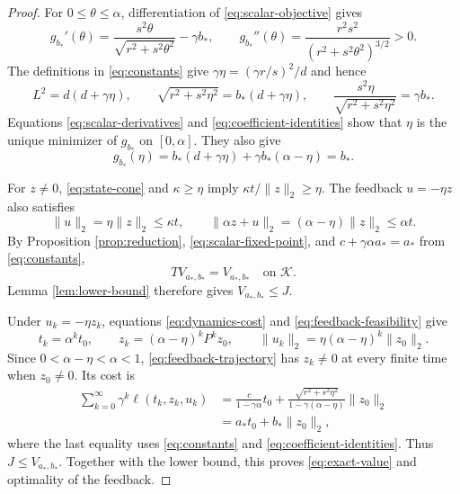 \documentclass[10pt]{article}
\begin{document}
\begin{proof}
For $0\leq\theta\leq\alpha$, differentiation of \eqref{eq:scalar-objective} gives
\begin{equation}
g_{b_*}'(\theta)=
\frac{s^2\theta}{\sqrt{r^2+s^2\theta^2}}-\gamma b_* ,
\qquad
g_{b_*}''(\theta)=
\frac{r^2s^2}{(r^2+s^2\theta^2)^{3/2}}>0.
\label{eq:scalar-derivatives}
\end{equation}
The definitions in \eqref{eq:constants} give $\gamma\eta=(\gamma r/s)^2/d$ and hence
\begin{equation}
L^2=d(d+\gamma\eta),\qquad
\sqrt{r^2+s^2\eta^2}=b_*(d+\gamma\eta),\qquad
\frac{s^2\eta}{\sqrt{r^2+s^2\eta^2}}=\gamma b_*.
\label{eq:coefficient-identities}
\end{equation}
Equations \eqref{eq:scalar-derivatives} and \eqref{eq:coefficient-identities} show that $\eta$ is the unique minimizer of $g_{b_*}$ on $[0,\alpha]$. They also give
\begin{equation}
g_{b_*}(\eta)
=b_*(d+\gamma\eta)+\gamma b_*(\alpha-\eta)
=b_*.
\label{eq:scalar-fixed-point}
\end{equation}

For $z\ne0$, \eqref{eq:state-cone} and $\kappa\geq\eta$ imply $\kappa t/\|z\|_2\geq\eta$. The feedback $u=-\eta z$ also satisfies
\begin{equation}
\|u\|_2=\eta\|z\|_2\leq\kappa t,
\qquad
\|\alpha z+u\|_2=(\alpha-\eta)\|z\|_2\leq\alpha t.
\label{eq:feedback-feasibility}
\end{equation}
By Proposition \ref{prop:reduction}, \eqref{eq:scalar-fixed-point}, and $c+\gamma\alpha a_*=a_*$ from \eqref{eq:constants},
\begin{equation}
TV_{a_*,b_*}=V_{a_*,b_*}\quad\text{on }\mathcal K.
\label{eq:bellman-fixed-point}
\end{equation}
Lemma \ref{lem:lower-bound} therefore gives $V_{a_*,b_*}\leq J$.

Under $u_k=-\eta z_k$, equations \eqref{eq:dynamics-cost} and \eqref{eq:feedback-feasibility} give
\begin{equation}
t_k=\alpha^k t_0,
\qquad
z_k=(\alpha-\eta)^kP^kz_0,
\qquad
\|u_k\|_2=\eta(\alpha-\eta)^k\|z_0\|_2.
\label{eq:feedback-trajectory}
\end{equation}
Since $0<\alpha-\eta<\alpha<1$, \eqref{eq:feedback-trajectory} has $z_k\ne0$ at every finite time when $z_0\ne0$. Its cost is
\begin{equation}
\begin{aligned}
\sum_{k=0}^{\infty}\gamma^k\ell(t_k,z_k,u_k)
&=\frac{c}{1-\gamma\alpha}t_0
+\frac{\sqrt{r^2+s^2\eta^2}}
{1-\gamma(\alpha-\eta)}\|z_0\|_2\\
&=a_*t_0+b_*\|z_0\|_2,
\end{aligned}
\label{eq:feedback-cost}
\end{equation}
where the last equality uses \eqref{eq:constants} and \eqref{eq:coefficient-identities}. Thus $J\leq V_{a_*,b_*}$. Together with the lower bound, this proves \eqref{eq:exact-value} and optimality of the feedback.
\end{proof}
\end{document}
